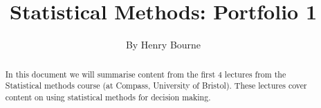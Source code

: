 \documentclass[a4paper]{article}
\title{Statistical Methods: Portfolio 1}
\author{By Henry Bourne}
\date{}
\begin{document}
\maketitle


\begin{abstract}
    In this document we will summarise content from the first 4 lectures from the Statistical methods course (at Compass, University of Bristol). These lectures cover content on using statistical methods for decision making.
\end{abstract}





\small


\end{document}
